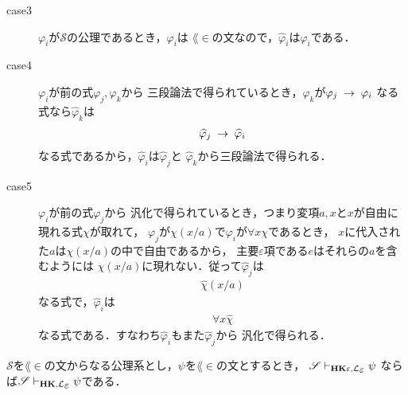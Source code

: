 \begin{metaprf}
\begin{description}
			\item[case3] $\varphi_{i}$が$\mathscr{S}$の公理であるとき，$\varphi_{i}$は
				$\lang{\in}$の文なので，$\widehat{\varphi}_{i}$は$\varphi_{i}$である．
				
			\item[case4] $\varphi_{i}$が前の式$\varphi_{j},\varphi_{k}$から
				三段論法で得られているとき，$\varphi_{k}$が$\varphi_{j} \hspace{0.25em}\rightarrow\hspace{0.25em} \varphi_{i}$
				なる式なら$\widehat{\varphi}_{k}$は
				\begin{align}
					\widehat{\varphi}_{j} \hspace{0.25em}\rightarrow\hspace{0.25em} \widehat{\varphi}_{i}
				\end{align}
				なる式であるから，$\widehat{\varphi}_{i}$は$\widehat{\varphi}_{j}$と
				$\widehat{\varphi}_{k}$から三段論法で得られる．
				
			\item[case5] $\varphi_{i}$が前の式$\varphi_{j}$から
				汎化で得られているとき，つまり変項$a,x$と$x$が自由に現れる式$\chi$が取れて，
				$\varphi_{j}$が$\chi(x/a)$で$\varphi_{i}$が$\forall x \chi$であるとき，
				$x$に代入された$a$は$\chi(x/a)$の中で自由であるから，
				主要$\varepsilon$項である$e$はそれらの$a$を含むようには
				$\chi(x/a)$に現れない．従って$\widehat{\varphi}_{j}$は
				\begin{align}
					\widehat{\chi}(x/a)
				\end{align}
				なる式で，$\widehat{\varphi}_{i}$は
				\begin{align}
					\forall x \widehat{\chi}
				\end{align}
				なる式である．すなわち$\widehat{\varphi}_{i}$もまた$\widehat{\varphi}_{j}$から
				汎化で得られる．
				\QED
		\end{description}
	\end{metaprf}
	
	\begin{screen}
		\begin{metathm}
		\label{metathm:Henkin_expansion_2}
			$\mathscr{S}$を$\lang{\in}$の文からなる公理系とし，$\psi$を$\lang{\in}$の文とするとき，
			$\mathscr{S} \provable{\mbox{{\bf HK}$\varepsilon$},\lang{\varepsilon}} \psi$
			ならば$\mathscr{S} \provable{\mbox{{\bf HK}},\lang{\varepsilon}} \psi$である．
		\end{metathm}
	\end{screen}
	
